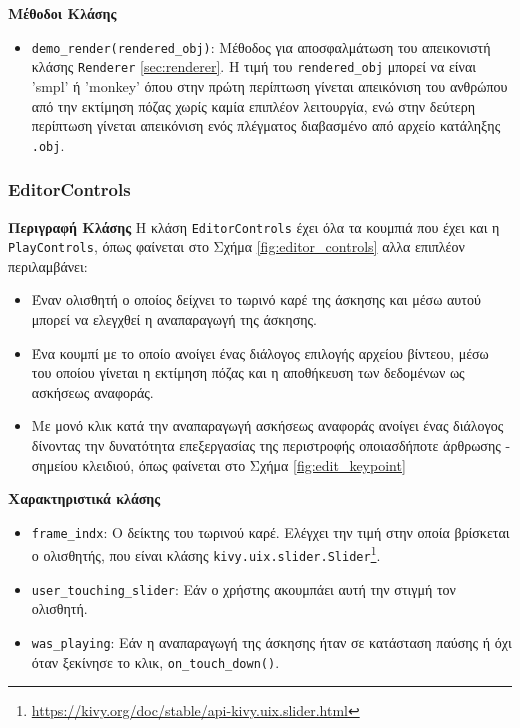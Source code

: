 \noindent\textbf{Μέθοδοι Κλάσης}
\begin{itemize}
	\item \texttt{demo\_render(rendered\_obj)}: Μέθοδος για αποσφαλμάτωση του απεικονιστή κλάσης \texttt{Renderer} \ref{sec:renderer}. Η τιμή του \texttt{rendered\_obj} μπορεί να είναι 'smpl' ή 'monkey' όπου στην πρώτη περίπτωση γίνεται απεικόνιση του ανθρώπου από την εκτίμηση πόζας χωρίς καμία επιπλέον λειτουργία, ενώ στην δεύτερη περίπτωση γίνεται απεικόνιση ενός πλέγματος διαβασμένο από αρχείο κατάληξης \texttt{.obj}.
\end{itemize}

\subsubsection{EditorControls}
\noindent\textbf{Περιγραφή Κλάσης}
Η κλάση \texttt{EditorControls} έχει όλα τα κουμπιά που έχει και η \texttt{PlayControls}, όπως φαίνεται στο Σχήμα \ref{fig:editor_controls} αλλα επιπλέον περιλαμβάνει:
\begin{itemize}
	\item Έναν ολισθητή ο οποίος δείχνει το τωρινό καρέ της άσκησης και μέσω αυτού μπορεί να ελεγχθεί η αναπαραγωγή της άσκησης.
	\item Ένα κουμπί με το οποίο ανοίγει ένας διάλογος επιλογής αρχείου βίντεου, μέσω του οποίου γίνεται η εκτίμηση πόζας και η αποθήκευση των δεδομένων ως ασκήσεως αναφοράς.
	\item Με μονό κλικ κατά την αναπαραγωγή ασκήσεως αναφοράς ανοίγει ένας διάλογος δίνοντας την δυνατότητα επεξεργασίας της περιστροφής οποιασδήποτε άρθρωσης - σημείου κλειδιού, όπως φαίνεται στο Σχήμα \ref{fig:edit_keypoint}
\end{itemize}

\noindent\textbf{Χαρακτηριστικά κλάσης}
\begin{itemize}
	\item \texttt{frame\_indx}: Ο δείκτης του τωρινού καρέ. Ελέγχει την τιμή στην οποία βρίσκεται ο ολισθητής, που είναι κλάσης \texttt{kivy.uix.slider.Slider}\footnote{\href{https://kivy.org/doc/stable/api-kivy.uix.slider.html}{https://kivy.org/doc/stable/api-kivy.uix.slider.html}}.
	\item \texttt{user\_touching\_slider}: Εάν ο χρήστης ακουμπάει αυτή την στιγμή τον ολισθητή.
	\item \texttt{was\_playing}: Εάν η αναπαραγωγή της άσκησης ήταν σε κατάσταση παύσης ή όχι όταν ξεκίνησε το κλικ, \texttt{on\_touch\_down()}.
\end{itemize}

